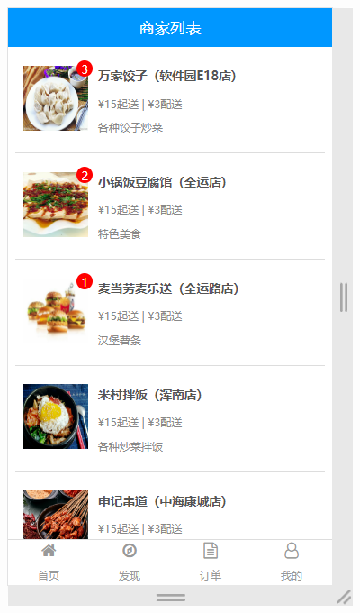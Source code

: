 \begin{figure}[H]
{\begin{minipage}[t]{0.22\linewidth}
            \includegraphics[scale=0.3]{figures/2.2.2.png}\\
        \end{minipage}
    }
\end{figure}
